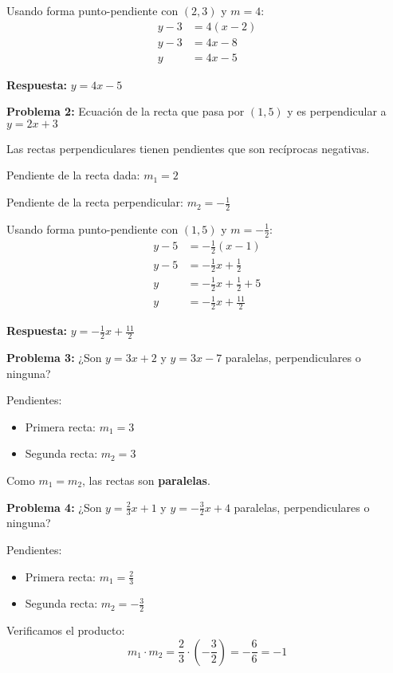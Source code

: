 Usando forma punto-pendiente con $(2, 3)$ y $m = 4$:
\begin{align*}
y - 3 &= 4(x - 2) \\
y - 3 &= 4x - 8 \\
y &= 4x - 5
\end{align*}

\textbf{Respuesta:} $y = 4x - 5$

\medskip

\textbf{Problema 2:} Ecuación de la recta que pasa por $(1, 5)$ y es perpendicular a $y = 2x + 3$

Las rectas perpendiculares tienen pendientes que son recíprocas negativas.

Pendiente de la recta dada: $m_1 = 2$

Pendiente de la recta perpendicular: $m_2 = -\frac{1}{2}$

Usando forma punto-pendiente con $(1, 5)$ y $m = -\frac{1}{2}$:
\begin{align*}
y - 5 &= -\frac{1}{2}(x - 1) \\
y - 5 &= -\frac{1}{2}x + \frac{1}{2} \\
y &= -\frac{1}{2}x + \frac{1}{2} + 5 \\
y &= -\frac{1}{2}x + \frac{11}{2}
\end{align*}

\textbf{Respuesta:} $y = -\frac{1}{2}x + \frac{11}{2}$

\medskip

\textbf{Problema 3:} ¿Son $y = 3x + 2$ y $y = 3x - 7$ paralelas, perpendiculares o ninguna?

Pendientes:
\begin{itemize}
    \item Primera recta: $m_1 = 3$
    \item Segunda recta: $m_2 = 3$
\end{itemize}

Como $m_1 = m_2$, las rectas son \textbf{paralelas}.

\medskip

\textbf{Problema 4:} ¿Son $y = \frac{2}{3}x + 1$ y $y = -\frac{3}{2}x + 4$ paralelas, perpendiculares o ninguna?

Pendientes:
\begin{itemize}
    \item Primera recta: $m_1 = \frac{2}{3}$
    \item Segunda recta: $m_2 = -\frac{3}{2}$
\end{itemize}

Verificamos el producto:
$$m_1 \cdot m_2 = \frac{2}{3} \cdot \left(-\frac{3}{2}\right) = -\frac{6}{6} = -1$$

